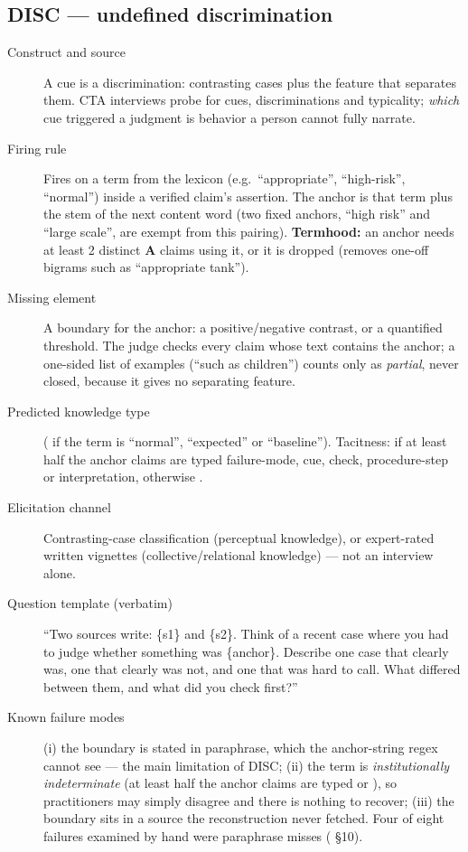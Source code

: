 \subsection{DISC --- undefined discrimination}

\begin{description}
  \item[Construct and source] A cue is a discrimination: contrasting cases plus the feature that
    separates them. CTA interviews probe for cues, discriminations and
    typicality; \emph{which} cue triggered a judgment is behavior a person cannot fully narrate.
  \item[Firing rule] Fires on a term from the  lexicon (e.g.\ \enquote{appropriate},
    \enquote{high-risk}, \enquote{normal}) inside a verified claim's assertion. The anchor is that
    term plus the stem of the next content word (two fixed anchors, \enquote{high risk} and
    \enquote{large scale}, are exempt from this pairing). \textbf{Termhood:} an anchor needs at
    least 2 distinct \textbf{A} claims using it, or it is dropped (removes one-off bigrams such as
    \enquote{appropriate tank}).
  \item[Missing element] A boundary for the anchor: a positive/negative contrast, or a quantified
    threshold. The judge checks every claim whose text contains the anchor; a one-sided list of
    examples (\enquote{such as children}) counts only as \emph{partial}, never closed, because it
    gives no separating feature.
  \item[Predicted knowledge type]  ( if the term is \enquote{normal},
    \enquote{expected} or \enquote{baseline}). Tacitness:  if at least half the
    anchor claims are typed failure-mode, cue, check, procedure-step or interpretation, otherwise
    .
  \item[Elicitation channel] Contrasting-case classification (perceptual knowledge), or
    expert-rated written vignettes (collective/relational knowledge) --- not an interview alone.
  \item[Question template (verbatim)] \enquote{Two sources write: \textquotedbl\{s1\}\textquotedbl{}
    and \textquotedbl\{s2\}\textquotedbl. Think of a recent case where you had to judge whether
    something was \{anchor\}. Describe one case that clearly was, one that clearly was not, and one
    that was hard to call. What differed between them, and what did you check first?}
  \item[Known failure modes] (i) the boundary is stated in paraphrase, which the anchor-string
    regex cannot see --- the main limitation of DISC; (ii) the term is
    \emph{institutionally indeterminate} (at least half the anchor claims are typed  or
    ), so practitioners may simply disagree and there is nothing to recover; (iii)
    the boundary sits in a source the reconstruction never fetched. Four of eight failures examined
    by hand were paraphrase misses ( \S10).
\end{description}

